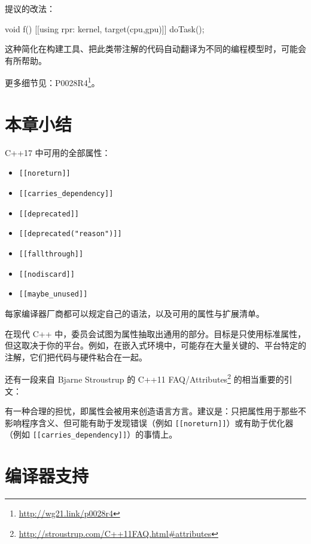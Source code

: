 提议的改法：

\begin{codebox}[cpp]
void f() {
[[using rpr: kernel, target(cpu,gpu)]]
doTask();
}
\end{codebox}

这种简化在构建工具、把此类带注解的代码自动翻译为不同的编程模型时，可能会有所帮助。

\begin{myInfoBox}
更多细节见：P0028R4\footnote{\url{http://wg21.link/p0028r4}}。
\end{myInfoBox}

\section{本章小结}

C++17 中可用的全部属性：

\begin{itemize}
\item \texttt{\texttt{[[noreturn]]}}
\item \texttt{\texttt{[[carries\_dependency]]}}
\item \texttt{\texttt{[[deprecated]]}}
\item \texttt{\texttt{[[deprecated("reason")]]}}
\item \texttt{\texttt{[[fallthrough]]}}
\item \texttt{\texttt{[[nodiscard]]}}
\item \texttt{\texttt{[[maybe\_unused]]}}
\end{itemize}

每家编译器厂商都可以规定自己的语法，以及可用的属性与扩展清单。

在现代 C++ 中，委员会试图为属性抽取出通用的部分。目标是只使用标准属性，但这取决于你的平台。例如，在嵌入式环境中，可能存在大量关键的、平台特定的注解，它们把代码与硬件粘合在一起。

还有一段来自 Bjarne Stroustrup 的 C++11 FAQ/Attributes\footnote{\url{http://stroustrup.com/C++11FAQ.html\#attributes}} 的相当重要的引文：

\begin{myQuote}
有一种合理的担忧，即属性会被用来创造语言方言。建议是：只把属性用于那些不影响程序含义、但可能有助于发现错误（例如 \texttt{\texttt{[[noreturn]]}}）或有助于优化器（例如 \texttt{\texttt{[[carries\_dependency]]}}）的事情上。
\end{myQuote}

\section{编译器支持}

